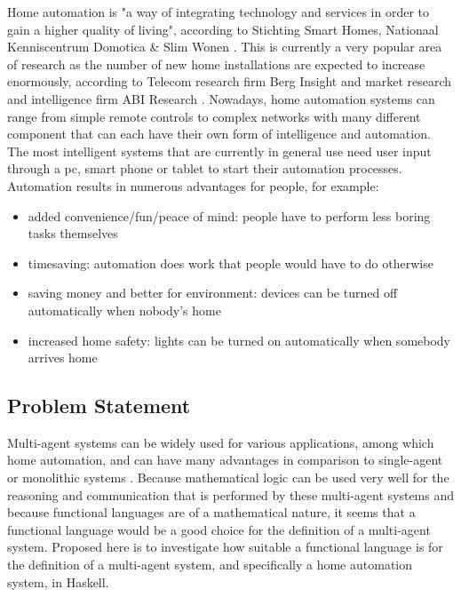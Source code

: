 \documentclass{sig-alternate-br}
\begin{document}
Home automation is "a way of integrating technology and services in order to gain a higher quality of living", according to Stichting Smart Homes, Nationaal Kenniscentrum Domotica \& Slim Wonen \cite{ssh}. This is currently a very popular area of research as the number of new home installations are expected to increase enormously, according to Telecom research firm Berg Insight \cite{berginsight} and market research and intelligence firm ABI Research \cite{abi}. Nowadays, home automation systems can range from simple remote controls to complex networks with many different component that can each have their own form of intelligence and automation. The most intelligent systems that are currently in general use need user input through a pc, smart phone or tablet to start their automation processes. Automation results in numerous advantages for people, for example:
\begin{itemize}
\item added convenience/fun/peace of mind: people have to perform less boring tasks themselves
\item timesaving: automation does work that people would have to do otherwise
\item saving money and better for environment: devices can be turned off automatically when nobody's home
\item increased home safety: lights can be turned on automatically when somebody arrives home
\end{itemize}
\subsection{Problem Statement}
Multi-agent systems can be widely used for various applications, among which home automation, and can have many advantages in comparison to single-agent or monolithic systems \cite{cm}.
Because mathematical logic can be used very well for the reasoning and communication that is performed by these multi-agent systems \cite{b:rara} and because functional languages are of a mathematical nature, it seems that a functional language would be a good choice for the definition of a multi-agent system. Proposed here is to investigate how suitable a functional language is for the definition of a multi-agent system, and specifically a home automation system, in Haskell.
\end{document}

